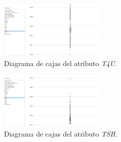 \documentclass[osajnl,twocolumn,showpacs,superscriptaddress,10pt,floatfix]{revtex4-1} %
\begin{document}
\begin{figure}[H]
    \centering
    \includegraphics[width=0.45\textwidth]{analysis/box_plot_T4U}
    \caption{Diagrama de cajas del atributo \textit{T4U}.}
    \label{figure:box_plot_T4U}
\end{figure}

\begin{figure}[H]
    \centering
    \includegraphics[width=0.45\textwidth]{analysis/box_plot_TSH}
    \caption{Diagrama de cajas del atributo \textit{TSH}.}
    \label{figure:box_plot_TSH}
\end{figure}

\onecolumngrid
\end{document}

